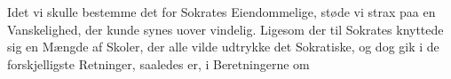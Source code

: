 \documentclass[12pt,a4paper]{book}
\begin{document}
Idet vi skulle bestemme det for Sokrates Eiendommelige,
støde vi strax paa en Vanskelighed, der kunde synes uover\-%
vindelig. Ligesom der til Sokrates knyttede sig en Mængde
af Skoler, der alle vilde udtrykke det Sokratiske, og dog gik
i de forskjelligste Retninger, saaledes er, i Beretningerne om
\end{document}
